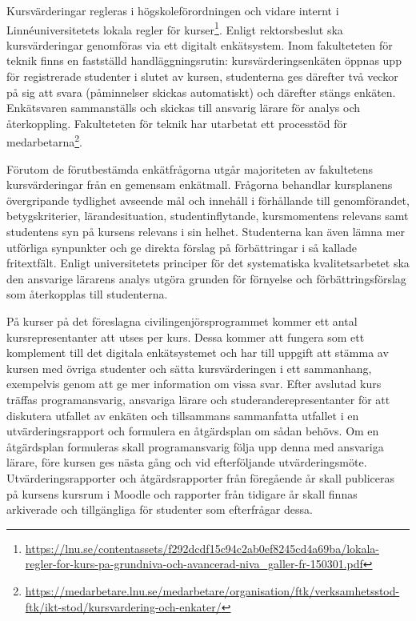 Kursvärderingar regleras i högskoleförordningen och vidare internt i Linnéuniversitetets lokala regler för kurser\footnote{\url{https://lnu.se/contentassets/f292dcdf15c94c2ab0ef8245cd4a69ba/lokala-regler-for-kurs-pa-grundniva-och-avancerad-niva_galler-fr-150301.pdf}}. Enligt rektorsbeslut ska kursvärderingar genomföras via ett digitalt enkätsystem. Inom fakulteteten för teknik finns en fastställd handläggningsrutin: kursvärderingsenkäten öppnas upp för registrerade studenter i slutet av kursen, studenterna ges därefter två veckor på sig att svara (påminnelser skickas automatiskt) och därefter stängs enkäten. Enkätsvaren sammanställs och skickas till ansvarig lärare för analys och återkoppling. Fakulteteten för teknik har utarbetat ett processtöd för medarbetarna\footnote{\url{https://medarbetare.lnu.se/medarbetare/organisation/ftk/verksamhetsstod-ftk/ikt-stod/kursvardering-och-enkater/}}.

Förutom de förutbestämda enkätfrågorna utgår majoriteten av fakultetens kursvärderingar från en gemensam enkätmall. Frågorna behandlar kursplanens övergripande tydlighet avseende mål och innehåll i förhållande till genomförandet, betygskriterier, lärandesituation, studentinflytande, kursmomentens relevans samt studentens syn på kursens relevans i sin helhet. Studenterna kan även lämna mer utförliga synpunkter och ge direkta förslag på förbättringar i så kallade fritextfält. Enligt universitetets principer för det systematiska kvalitetsarbetet ska den ansvarige lärarens analys utgöra grunden för förnyelse och förbättringsförslag som återkopplas till studenterna.

På kurser på det föreslagna civilingenjörsprogrammet kommer ett antal kursrepresentanter att utses per kurs. Dessa kommer att fungera som ett komplement till det digitala enkätsystemet och har till uppgift att stämma av kursen med övriga studenter och sätta kursvärderingen i ett sammanhang, exempelvis genom att ge mer information om vissa svar. Efter avslutad kurs träffas programansvarig, ansvariga lärare och studeranderepresentanter för att diskutera utfallet av enkäten och tillsammans sammanfatta utfallet i en utvärderingsrapport och formulera en åtgärdsplan om sådan behövs. Om en åtgärdsplan formuleras skall programansvarig följa upp denna med ansvariga lärare, före kursen ges nästa gång och vid efterföljande utvärderingsmöte. Utvärderingsrapporter och åtgärdsrapporter från föregående år skall publiceras på kursens kursrum i Moodle och rapporter från tidigare år skall finnas arkiverade och tillgängliga för studenter som efterfrågar dessa.

